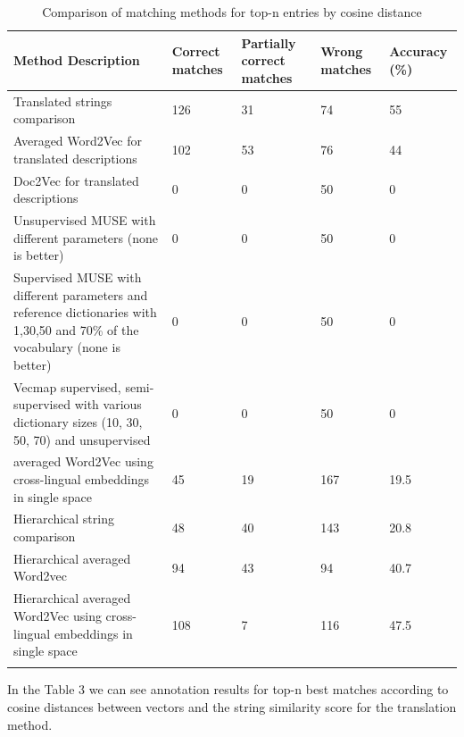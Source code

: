 \documentclass[11pt,a4paper]{article}
\begin{document}
\begin{center}
	\begin{table}[!htbp]
		\caption{Comparison of matching methods for top-n entries by cosine distance}
		\begin{tabular}{p{3.3cm}|p{0.8cm}|p{0.9cm}|p{0.8cm}|p{0.8cm}}
			Method \newline Description & Correct matches & Partially correct matches & Wrong matches &
			Accuracy \newline (\%)\\
			\hline
			\hline
			Translated strings comparison & 126 & 31 & 74 & 55\\
			\hline
			Averaged Word2Vec for translated descriptions & 102 & 53 & 76 & 44\\
			\hline
			Doc2Vec for translated descriptions & 0 & 0 & 50 & 0\\
			\hline
			Unsupervised MUSE with different parameters (none is better) & 0 & 0 & 50 & 0\\
			\hline
			Supervised MUSE with different parameters and reference dictionaries with 1,30,50 and 70\% of the vocabulary (none is better) & 0 & 0 & 50 & 0\\
			\hline
			Vecmap supervised, semi-supervised with various dictionary sizes (10, 30, 50, 70) and unsupervised  & 0 & 0 & 50 & 0\\
			\hline
			averaged Word2Vec using cross-lingual embeddings in single space  & 45 & 19 & 167 & 19.5\\
			\hline
			Hierarchical string comparison & 48 & 40 & 143 & 20.8\\
			\hline
			Hierarchical averaged Word2vec & 94 & 43 & 94 & 40.7\\
			\hline
			Hierarchical averaged Word2Vec using cross-lingual embeddings in single space  & 108 & 7 & 116 & 47.5\\
			\label{table-accuracies}
		\end{tabular}
	\end{table}
\end{center}

In the Table 3 we can see annotation results for top-n best matches according to cosine distances between vectors and the string similarity score for the translation method.
\end{document}
